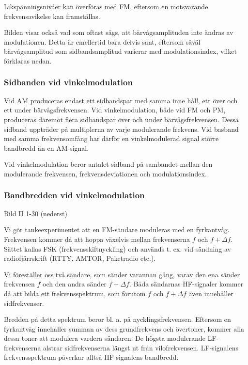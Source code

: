 Likspänningsnivåer kan överföras med FM, eftersom en motsvarande frekvensavikelse kan
framställas.

Bilden visar också vad som oftast sägs, att bärvågsamplituden inte ändras av modulationen.
Detta är emellertid bara delvis sant, eftersom såväl bärvågsamplitud som sidbandsamplitud
varierar med modulationsindex, vilket förklaras nedan.

\subsubsection{Sidbanden vid vinkelmodulation}

Vid AM produceras endast ett sidbandspar med samma inne hål!, ett över och ett under
bärvågsfrekvensen. Vid vinkelmodulation, både vid FM och PM, produceras däremot flera
sidbandspar över och under bärvågsfrekvensen. Dessa sidband uppträder på multiplerna av
varje modulerande frekvens. Vid basband med samma frekvensomfång har därför en
vinkelmodulerad signal större bandbredd än en AM-signal.

Vid vinkelmodulation beror antalet sidband på sambandet mellan den modulerande frekvensen,
frekvensdeviationen och modulationsindex.

\subsubsection{Bandbredden vid vinkelmodulation}

Bild II 1-30 (nederst)

Vi gör tankeexperimentet att en FM-sändare moduleras med en fyrkantvåg. Frekvensen
kommer då att hoppa växelvis mellan frekvenserna $f$ och $f + \Delta f$. Sättet kallas FSK
(frekvensskiftnyckling) och används t. ex. vid sändning av radiofjärrskrift (RTTY, AMTOR,
Paketradio etc.).

Vi föreställer oss två sändare, som sänder varannan gång, varav den ena sänder frekvensen
$f$ och den andra sänder $f + \Delta f$. Båda sändarnas HF-signaler kommer då att bilda
ett frekvensspektrum, som förutom $f$ och $f + \Delta f$ även innehåller sidfrekvenser.

Bredden på detta spektrum beror bl. a. på nycklingsfrekvensen. Eftersom en fyrkantvåg
innehåller summan av dess grundfrekvens och övertoner, kommer alla dessa toner att
modulera vardera sändaren. De högsta modulerande LF-frekvenserna alstrar sidfrekvenserna
längst ut från vilofrekvensen. LF-signalens frekvensspektrum påverkar alltså
HF-signalens bandbredd.

